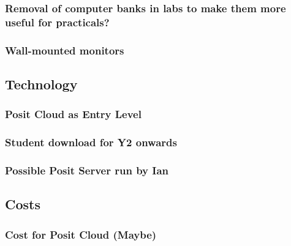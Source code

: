 \documentclass[
  11pt,
  letterpaper,
  oneside,
  open=any]{scrbook}
\begin{document}
\hypertarget{removal-of-computer-banks-in-labs-to-make-them-more-useful-for-practicals}{%
\subsubsection{Removal of computer banks in labs to make them more
useful for
practicals?}\label{removal-of-computer-banks-in-labs-to-make-them-more-useful-for-practicals}}

\hypertarget{wall-mounted-monitors}{%
\subsubsection{Wall-mounted monitors}\label{wall-mounted-monitors}}

\hypertarget{section}{%
\subsubsection{}\label{section}}

\hypertarget{technology}{%
\subsection{Technology}\label{technology}}

\hypertarget{posit-cloud-as-entry-level}{%
\subsubsection{Posit Cloud as Entry
Level}\label{posit-cloud-as-entry-level}}

\hypertarget{student-download-for-y2-onwards}{%
\subsubsection{Student download for Y2
onwards}\label{student-download-for-y2-onwards}}

\hypertarget{possible-posit-server-run-by-ian}{%
\subsubsection{Possible Posit Server run by
Ian}\label{possible-posit-server-run-by-ian}}

\hypertarget{costs}{%
\subsection{Costs}\label{costs}}

\hypertarget{cost-for-posit-cloud-maybe}{%
\subsubsection{Cost for Posit Cloud
(Maybe)}\label{cost-for-posit-cloud-maybe}}
\end{document}
